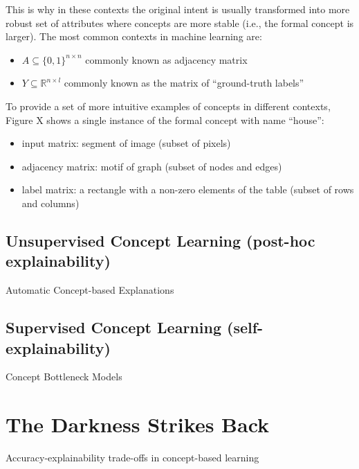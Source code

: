 \documentclass[withindex,glossary]{cam-thesis}
\theoremstyle{plain}
\theoremstyle{definition}
\theoremstyle{remark}
\begin{document}
This is why in these contexts the original intent is usually transformed into more robust set of attributes where concepts are more stable (i.e., the formal concept is larger). The most common contexts in machine learning are:
\begin{itemize}
    \item $A \subseteq \{0,1\}^{n \times n}$ commonly known as adjacency matrix
    \item $Y \subseteq \mathbb{R}^{n \times l}$ commonly known as the matrix of ``ground-truth labels''
\end{itemize}

To provide a set of more intuitive examples of concepts in different contexts, Figure X shows a single instance of the formal concept with name ``house'':
\begin{itemize}
    \item input matrix: segment of image (subset of pixels)
    \item adjacency matrix: motif of graph (subset of nodes and edges)
    \item label matrix: a rectangle with a non-zero elements of the table (subset of rows and columns)
\end{itemize}



\subsection{Unsupervised Concept Learning (post-hoc explainability)}
Automatic Concept-based Explanations

\subsection{Supervised Concept Learning (self-explainability)}
Concept Bottleneck Models

\section{The Darkness Strikes Back}
Accuracy-explainability trade-offs in concept-based learning
\end{document}
